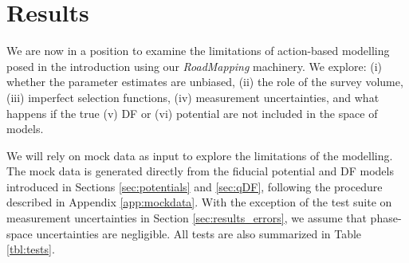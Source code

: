 \documentclass[iop,revtex4,numberedappendix,appendixfloats]{emulateapj}
\newcommand{\RM}{{\sl RoadMapping}}
\begin{document}
\section{Results} \label{sec:results}

We are now in a position to examine the limitations of action-based modelling posed in the introduction using our \RM{} machinery. We explore: (i) whether the parameter estimates are unbiased, (ii) the role of the survey volume, (iii) imperfect selection functions, (iv) measurement uncertainties, and what happens if the true (v) DF or (vi) potential are not included in the space of models. 

We will rely on mock data as input to explore the limitations of the modelling. The mock data is generated directly from the fiducial potential and DF models introduced in Sections \ref{sec:potentials} and \ref{sec:qDF}, following the procedure described in Appendix \ref{app:mockdata}. With the exception of the test suite on measurement uncertainties in Section \ref{sec:results_errors}, we assume that phase-space uncertainties are negligible. All tests are also summarized in Table \ref{tbl:tests}. 
\end{document}
